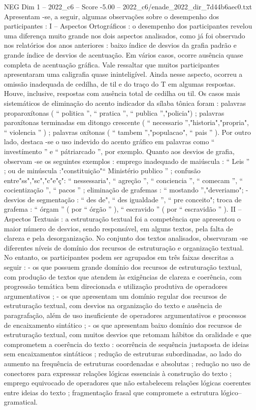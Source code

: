 \begin{textsample}{NEG Dim 1 – 2022\_c6 – Score -5.00 – 2022\_c6/enade\_2022\_dir\_7d44b6aec0.txt}
Apresentam -se, a seguir, algumas observações sobre o desempenho dos participantes : I – Aspectos Ortográficos : o desempenho dos participantes revelou uma diferença muito grande nos dois aspectos analisados, como já foi observado nos relatórios dos anos anteriores : baixo índice de desvios da grafia padrão e grande índice de desvios de acentuação.
Em vários casos, ocorre ausência quase completa de acentuação gráfica.
Vale ressaltar que muitos participantes apresentaram uma caligrafia quase ininteligível.
Ainda nesse aspecto, ocorreu a omissão inadequada de cedilha, de til e do traço do T em algumas respostas.
Houve, inclusive, respostas com ausência total de cedilha ou til.
Os casos mais sistemáticos de eliminação do acento indicador da sílaba tônica foram : palavras proparoxítonas ( “ politica ”, “ pratica ”, “ publica ”,"policia") ; palavras paroxítonas terminadas em ditongo crescente ( “ necessario ”,"historia","propria", “ violencia ” ) ; palavras oxítonas ( “ tambem ”,"populacao", “ pais ” ).
Por outro lado, destaca -se o uso indevido do acento gráfico em palavras como “ investímento ” e “ pátriarcado ”, por exemplo.
Quanto aos desvios de grafia, observam -se os seguintes exemplos : emprego inadequado de maiúscula : “ Leis ” ; ou de minúscula :"constituição"“ Ministério publico ” ; confusão entre"ss","sc","c"e"ç": “ nessessaria", “ agreção ”, “ conciencia ”, “ comecam ”, “ cocientização ”, “ pacos ” ; eliminação de grafemas : “ mostando ”,"deveriamo"; - desvios de segmentação : “ des de", “ des igualdade ”, “ pre conceito"; troca de grafema : “ órgam ” ( por “ órgão ” ), “ escravido ” ( por “ escravidão ” ).
II – Aspectos Textuais : a estruturação textual foi a competência que apresentou o maior número de desvios, sendo responsável, em alguns textos, pela falta de clareza e pela desorganização.
No conjunto dos textos analisados, observaram -se diferentes níveis de domínio dos recursos de estruturação e organização textual.
No entanto, os participantes podem ser agrupados em três faixas descritas a seguir : - os que possuem grande domínio dos recursos de estruturação textual, com produção de textos que atendem às exigências de clareza e coerência, com progressão temática bem direcionada e utilização produtiva de operadores argumentativos ; - os que apresentam um domínio regular dos recursos de estruturação textual, com desvios na organização do texto e ausência de paragrafação, além de uso insuficiente de operadores argumentativos e processos de encaixamento sintático ; - os que apresentam baixo domínio dos recursos de estruturação textual, com muitos desvios que retomam hábitos da oralidade e que comprometem a coerência do texto : ocorrência de sequência justaposta de ideias sem encaixamentos sintáticos ; redução de estruturas subordinadas, ao lado do aumento na frequência de estruturas coordenadas e absolutas ; redução no uso de conectores para expressar relações lógicas essenciais à construção do texto ; emprego equivocado de operadores que não estabelecem relações lógicas coerentes entre ideias do texto ; fragmentação frasal que compromete a estrutura lógico–gramatical.

\end{textsample}
